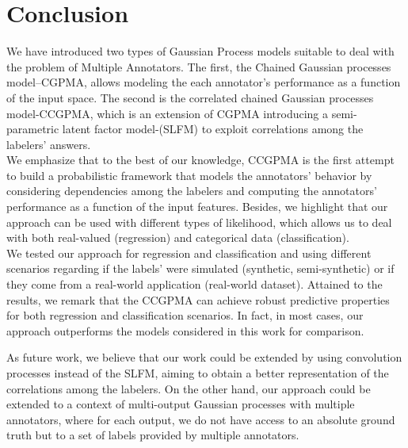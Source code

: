 \documentclass[journal]{IEEEtran}
\begin{document}
\section{Conclusion}
We have introduced two types of Gaussian Process models suitable to deal with the problem of Multiple Annotators. The first, the Chained Gaussian processes model--CGPMA, allows modeling the each annotator's performance as a function of the input space. The second is the correlated chained Gaussian processes model-CCGPMA, which is an extension of CGPMA introducing a semi-parametric latent factor model-(SLFM) to exploit correlations among the labelers' answers. \\
We emphasize that to the best of our knowledge, CCGPMA is the first attempt to build a probabilistic framework that models the annotators' behavior by considering dependencies among the labelers and computing the annotators' performance as a function of the input features. Besides, we highlight that our approach can be used with different types of likelihood, which allows us to deal with both real-valued (regression) and categorical data (classification).\\ 
We tested our approach for regression and classification and using different scenarios regarding if the labels' were simulated (synthetic, semi-synthetic) or if they come from a real-world application (real-world dataset). Attained to the results, we remark that the CCGPMA can achieve robust predictive properties for both regression and classification scenarios. In fact, in most cases, our approach outperforms the models considered in this work for comparison. 

As future work, we believe that our work could be extended by using convolution processes \cite{alvarez2011computationally} instead of the SLFM, aiming to obtain a better representation of the correlations among the labelers. On the other hand, our approach could be extended to a context of multi-output Gaussian processes with multiple annotators, where for each output, we do not have access to an absolute ground truth but to a set of labels provided by multiple annotators. 






\end{document}
